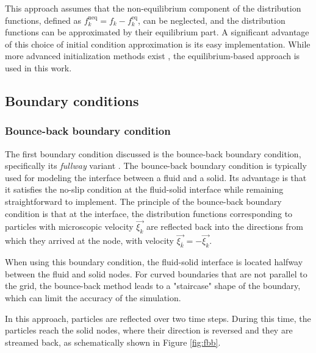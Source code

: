 This approach assumes that the non-equilibrium component of the distribution functions, defined as \( f^{\mathrm{neq}}_{k} = f_{k} - f^{\mathrm{eq}}_{k} \), can be neglected, and the distribution functions can be approximated by their equilibrium part. A significant advantage of this choice of initial condition approximation is its easy implementation. While more advanced initialization methods exist  \cite{PE}, the equilibrium-based approach is used in this work.

\subsection{Boundary conditions}


\subsubsection*{Bounce-back boundary condition}\label{bounce-back}
The first boundary condition discussed is the bounce-back boundary condition, specifically its \textit{fullway} variant \cite{Kruger}. The bounce-back boundary condition is typically used for modeling the interface between a fluid and a solid. Its advantage is that it satisfies the no-slip condition at the fluid-solid interface while remaining straightforward to implement. The principle of the bounce-back boundary condition is that at the interface, the distribution functions corresponding to particles with microscopic velocity \( \vec{\xi_{k}} \) are reflected back into the directions from which they arrived at the node, with velocity \( \vec{\xi_{\bar{k}}} = -\vec{\xi_{k}} \).

When using this boundary condition, the fluid-solid interface is located halfway between the fluid and solid nodes. For curved boundaries that are not parallel to the grid, the bounce-back method leads to a "staircase" shape of the boundary, which can limit the accuracy of the simulation.

In this approach, particles are reflected over two time steps. During this time, the particles reach the solid nodes, where their direction is reversed and they are streamed back, as schematically shown in Figure \ref{fig:fbb}.

